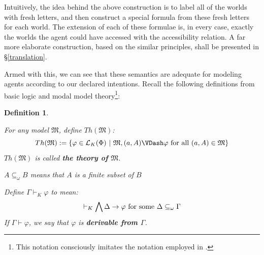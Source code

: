 \documentclass[11pt]{article}
\numberwithin{equation}{subsection}
\newtheorem{mydef}[theorem]{Definition}
\renewcommand{\Omega}{\mathfrak{M}}
\renewcommand{\phi}{\varphi}
\begin{document}
Intuitively, the idea behind the above construction is to label all of the
worlds with fresh letters, and then construct a special formula from these
fresh letters for each world.  The extension of each of these formulae is, in every case,
exactly the worlds the agent could have accessed with the
accessibility relation.  A far more elaborate construction, based on
the similar principles, shall be presented in \S\ref{translation}.

Armed with this, we can see that these semantics are adequate for
modeling agents according to our declared intentions.
Recall the following definitions from basic logic and modal model
theory\footnote{This notation consciously imitates the notation
  employed in \citep{blackburn_modal_2001}.}:
\begin{mydef}\label{basicdefs}
\begin{mynum}
\item\label{basicdefsI} For any model $\Omega$, define $Th(\Omega)$:
\[Th(\Omega) := \{ \phi \in \mathcal{L}_K(\Phi) \ |\ \Omega, (a,A)
\VDash \phi \textup{ for all $(a,A) \in \Omega$}\}\]
$Th(\Omega)$ is called \textbf{the theory of $\Omega$}.

\item\label{basicdefsII} $A \subseteq_\omega B$ means that $A$ is a finite subset of $B$

\item\label{basicdefsIII} Define $\Gamma \vdash_K \phi$ to mean:
\[ \vdash_K \bigwedge \Delta \to \phi \textup{ for some $\Delta
  \subseteq_\omega \Gamma$} \]
If $\Gamma \vdash \phi$, we say that $\phi$ is \textbf{derivable from
  $\Gamma$}.
\end{mynum}
\end{mydef}
\end{document}
